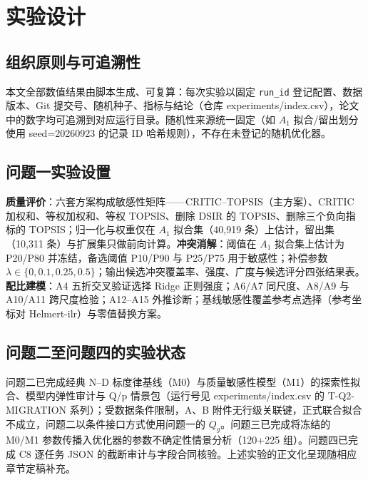 \section{实验设计}
\label{sec:experiments}

\subsection{组织原则与可追溯性}
本文全部数值结果由脚本生成、可复算：每次实验以固定 \texttt{run\_id} 登记配置、数据版本、Git 提交号、随机种子、指标与结论（仓库 experiments/index.csv），论文中的数字均可追溯到对应运行目录。随机性来源统一固定（如 $A_1$ 拟合/留出划分使用 seed=20260923 的记录 ID 哈希规则），不存在未登记的随机优化器。

\subsection{问题一实验设置}
\textbf{质量评价}：六套方案构成敏感性矩阵——CRITIC--TOPSIS（主方案）、CRITIC 加权和、等权加权和、等权 TOPSIS、删除 DSIR 的 TOPSIS、删除三个负向指标的 TOPSIS；归一化与权重仅在 $A_1$ 拟合集（40,919 条）上估计，留出集（10,311 条）与扩展集只做前向计算。\textbf{冲突消解}：阈值在 $A_1$ 拟合集上估计为 P20/P80 并冻结，备选阈值 P10/P90 与 P25/P75 用于敏感性；补偿参数 $\lambda\in\{0,0.1,0.25,0.5\}$；输出候选冲突覆盖率、强度、广度与候选评分四张结果表。\textbf{配比建模}：A4 五折交叉验证选择 Ridge 正则强度；A6/A7 同尺度、A8/A9 与 A10/A11 跨尺度检验；A12--A15 外推诊断；基线敏感性覆盖参考点选择（参考坐标对 Helmert-ilr）与零值替换方案。

\subsection{问题二至问题四的实验状态}
问题二已完成经典 N--D 标度律基线（M0）与质量敏感性模型（M1）的探索性拟合、模型内弹性审计与 Q/p 情景包（运行号见 experiments/index.csv 的 T-Q2-MIGRATION 系列）；受数据条件限制，A、B 附件无行级关联键，正式联合拟合不成立，问题二以条件接口方式使用问题一的 $Q_g$。问题三已完成将冻结的 M0/M1 参数传播入优化器的参数不确定性情景分析（120+225 组）。问题四已完成 C8 逐任务 JSON 的截断审计与字段合同核验。上述实验的正文化呈现随相应章节定稿补充。
